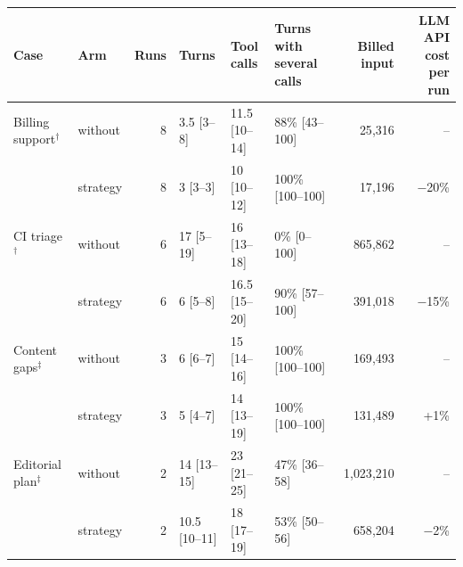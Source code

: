 \begin{tabular}{llrlllrr}
\toprule
Case & Arm & Runs & Turns & Tool calls & Turns with several calls & Billed input & LLM API cost per run \\
\midrule
Billing support$^\dagger$ & without & 8 & 3.5 [3--8] & 11.5 [10--14] & 88\% [43--100] & 25{,}316 & -- \\
 & strategy & 8 & 3 [3--3] & 10 [10--12] & 100\% [100--100] & 17{,}196 & $-$20\% \\
\addlinespace
CI triage$^\dagger$ & without & 6 & 17 [5--19] & 16 [13--18] & 0\% [0--100] & 865{,}862 & -- \\
 & strategy & 6 & 6 [5--8] & 16.5 [15--20] & 90\% [57--100] & 391{,}018 & $-$15\% \\
\addlinespace
Content gaps$^\ddagger$ & without & 3 & 6 [6--7] & 15 [14--16] & 100\% [100--100] & 169{,}493 & -- \\
 & strategy & 3 & 5 [4--7] & 14 [13--19] & 100\% [100--100] & 131{,}489 & +1\% \\
\addlinespace
Editorial plan$^\ddagger$ & without & 2 & 14 [13--15] & 23 [21--25] & 47\% [36--58] & 1{,}023{,}210 & -- \\
 & strategy & 2 & 10.5 [10--11] & 18 [17--19] & 53\% [50--56] & 658{,}204 & $-$2\% \\
\bottomrule
\end{tabular}
